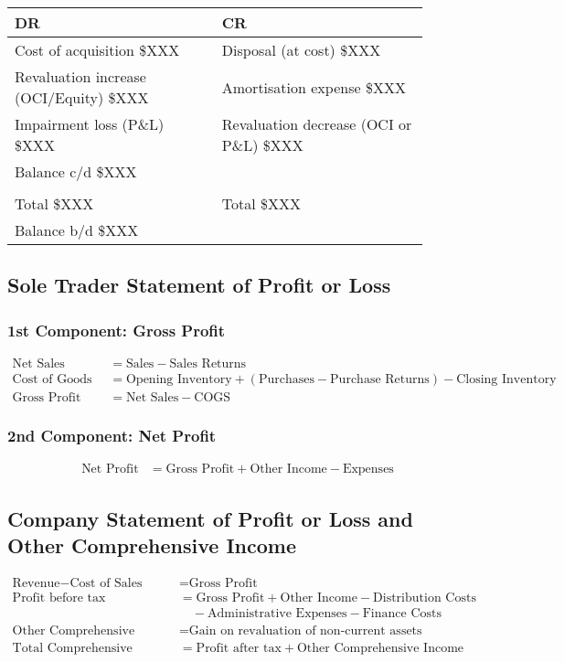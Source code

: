 \begin{tabular}{@{}p{0.45\linewidth} p{0.45\linewidth}@{}}
\textbf{DR} & \textbf{CR} \\ \midrule
Cost of acquisition \hfill \$XXX & Disposal (at cost) \hfill \$XXX \\
Revaluation increase (OCI/Equity) \hfill \$XXX & Amortisation expense \hfill \$XXX \\
Impairment loss (P\&L) \hfill \$XXX & Revaluation decrease (OCI or P\&L) \hfill \$XXX \\
Balance c/d \hfill \$XXX & \\[3pt]
\multicolumn{2}{c}{\hrulefill} \\
Total \hfill \$XXX & Total \hfill \$XXX \\[6pt]
Balance b/d \hfill \$XXX & \\
\end{tabular}

\subsection{Sole Trader Statement of Profit or Loss}

\subsubsection{1st Component: Gross Profit} 
\begin{align*}
\text{Net Sales} &= \text{Sales} - \text{Sales Returns} \\
\text{Cost of Goods Sold (COGS)} &= \text{Opening Inventory} + (\text{Purchases} - \text{Purchase Returns}) - \text{Closing Inventory} \\
\text{Gross Profit} &= \text{Net Sales} - \text{COGS}
\end{align*}

\subsubsection{2nd Component: Net Profit}
\begin{align*}
\text{Net Profit} &= \text{Gross Profit} + \text{Other Income} - \text{Expenses}
\end{align*}

\subsection{Company Statement of Profit or Loss and Other Comprehensive Income}
\begin{align*}
\text{Revenue} - \text{Cost of Sales} &= \text{Gross Profit} \\
\text{Profit before tax} &= \text{Gross Profit} + \text{Other Income} - \text{Distribution Costs} \\
&\quad - \text{Administrative Expenses} - \text{Finance Costs} \\
\text{Other Comprehensive Income} &= \text{Gain on revaluation of non-current assets} \\
\text{Total Comprehensive Income} &= \text{Profit after tax} + \text{Other Comprehensive Income}
\end{align*}

